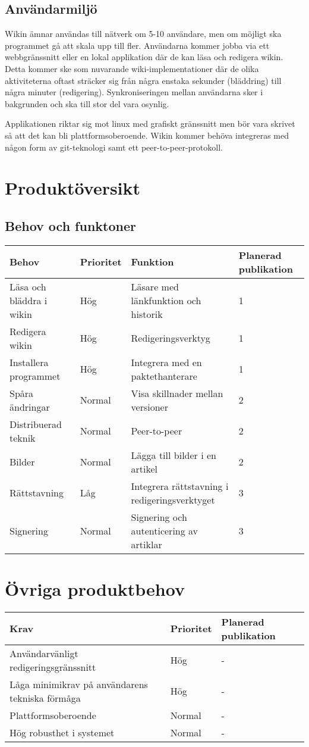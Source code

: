 \subsection{Användarmiljö}
Wikin ämnar användas till nätverk om 5-10 användare, men om möjligt ska programmet gå att skala upp till fler. Användarna kommer jobba via ett webbgränssnitt eller en lokal applikation där de kan läsa och redigera wikin. Detta kommer ske som nuvarande wiki-implementationer där de olika aktiviteterna oftast sträcker sig från några enstaka sekunder (bläddring) till några minuter (redigering). Synkroniseringen mellan användarna sker i bakgrunden och ska till stor del vara osynlig.

Applikationen riktar sig mot linux med grafiskt gränssnitt men bör vara skrivet så att det kan bli plattformsoberoende. Wikin kommer behöva integreras med någon form av git-teknologi samt ett peer-to-peer-protokoll.
\section{Produktöversikt}
\subsection*{Behov och funktoner}
\begin{tabular}{|l|l|l|l|}
\hline
Behov & Prioritet & Funktion & Planerad publikation \\
\hline
Läsa och bläddra i wikin & Hög & Läsare med länkfunktion och historik & 1 \\
\hline
Redigera wikin & Hög & Redigeringsverktyg & 1 \\
\hline
Installera programmet & Hög & Integrera med en paktethanterare & 1 \\
\hline
Spåra ändringar & Normal & Visa skillnader mellan versioner & 2 \\
\hline
Distribuerad teknik & Normal & Peer-to-peer & 2 \\
\hline 
Bilder & Normal & Lägga till bilder i en artikel & 2 \\
\hline
Rättstavning & Låg & Integrera rättstavning i redigeringsverktyget & 3 \\
\hline
Signering & Normal & Signering och autenticering av artiklar & 3 \\
\hline
\end{tabular}
\section{Övriga produktbehov}
\begin{tabular}{|l|l|l|}
\hline
Krav & Prioritet & Planerad publikation \\
\hline
Användarvänligt redigeringsgränssnitt & Hög & - \\
\hline
Låga minimikrav på användarens tekniska förmåga & Hög & - \\
\hline
Plattformsoberoende & Normal & - \\
\hline
Hög robusthet i systemet & Normal & - \\
\hline
\end{tabular}

